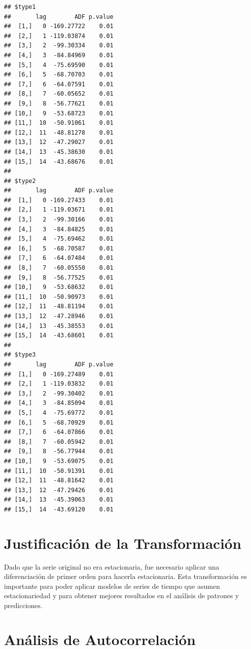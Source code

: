 \documentclass[
]{book}
\begin{document}
\begin{verbatim}
## $type1
##       lag        ADF p.value
##  [1,]   0 -169.27722    0.01
##  [2,]   1 -119.03874    0.01
##  [3,]   2  -99.30334    0.01
##  [4,]   3  -84.84969    0.01
##  [5,]   4  -75.69590    0.01
##  [6,]   5  -68.70703    0.01
##  [7,]   6  -64.07591    0.01
##  [8,]   7  -60.05652    0.01
##  [9,]   8  -56.77621    0.01
## [10,]   9  -53.68723    0.01
## [11,]  10  -50.91061    0.01
## [12,]  11  -48.81278    0.01
## [13,]  12  -47.29027    0.01
## [14,]  13  -45.38630    0.01
## [15,]  14  -43.68676    0.01
## 
## $type2
##       lag        ADF p.value
##  [1,]   0 -169.27433    0.01
##  [2,]   1 -119.03671    0.01
##  [3,]   2  -99.30166    0.01
##  [4,]   3  -84.84825    0.01
##  [5,]   4  -75.69462    0.01
##  [6,]   5  -68.70587    0.01
##  [7,]   6  -64.07484    0.01
##  [8,]   7  -60.05550    0.01
##  [9,]   8  -56.77525    0.01
## [10,]   9  -53.68632    0.01
## [11,]  10  -50.90973    0.01
## [12,]  11  -48.81194    0.01
## [13,]  12  -47.28946    0.01
## [14,]  13  -45.38553    0.01
## [15,]  14  -43.68601    0.01
## 
## $type3
##       lag        ADF p.value
##  [1,]   0 -169.27489    0.01
##  [2,]   1 -119.03832    0.01
##  [3,]   2  -99.30402    0.01
##  [4,]   3  -84.85094    0.01
##  [5,]   4  -75.69772    0.01
##  [6,]   5  -68.70929    0.01
##  [7,]   6  -64.07866    0.01
##  [8,]   7  -60.05942    0.01
##  [9,]   8  -56.77944    0.01
## [10,]   9  -53.69075    0.01
## [11,]  10  -50.91391    0.01
## [12,]  11  -48.81642    0.01
## [13,]  12  -47.29426    0.01
## [14,]  13  -45.39063    0.01
## [15,]  14  -43.69120    0.01
\end{verbatim}

\section{Justificación de la Transformación}\label{justificaciuxf3n-de-la-transformaciuxf3n}

Dado que la serie original no era estacionaria, fue necesario aplicar una diferenciación de primer orden para hacerla estacionaria. Esta transformación es importante para poder aplicar modelos de series de tiempo que asumen estacionariedad y para obtener mejores resultados en el análisis de patrones y predicciones.

\section{Análisis de Autocorrelación}\label{anuxe1lisis-de-autocorrelaciuxf3n}
\end{document}
